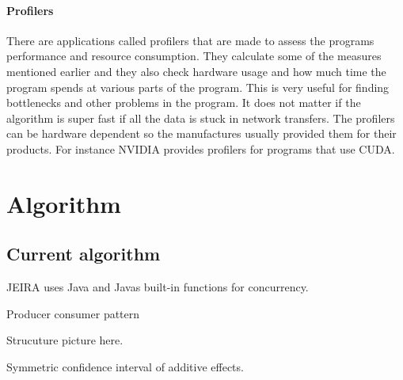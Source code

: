 \documentclass[10pt,a4paper]{report}
\begin{document}


\subsubsection{Profilers}
There are applications called profilers that are made to assess the programs performance and resource consumption. They calculate some of the measures mentioned earlier and they also check hardware usage and how much time the program spends at various parts of the program. This is very useful for finding bottlenecks and other problems in the program. It does not matter if the algorithm is super fast if all the data is stuck in network transfers. The profilers can be hardware dependent so the manufactures usually provided them for their products. For instance NVIDIA provides profilers for programs that use CUDA.\cite{introduction_hpc_hager, cuda_best_practice}

\clearpage
\chapter{Algorithm}







\section{Current algorithm}
JEIRA uses Java and Javas built-in functions for concurrency.

Producer consumer pattern

Strucuture picture here.

Symmetric confidence interval of additive effects.

\end{document}
